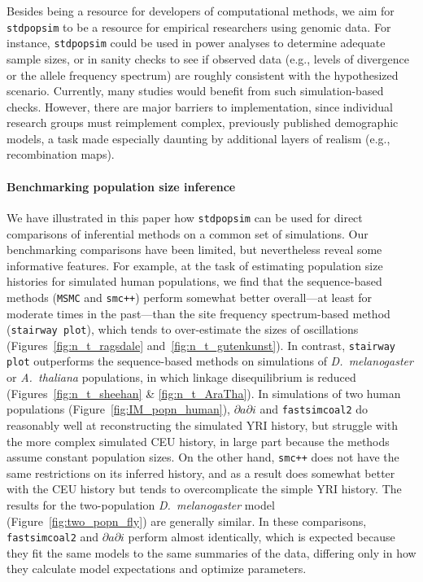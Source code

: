 \documentclass[12pt,halfline,a4paper]{ouparticle}
\newcommand{\stdpopsim}{\texttt{stdpopsim}\xspace}
\newcommand{\dadi}{$\partial a \partial i$\xspace}
\newcommand{\MSMC}{\texttt{MSMC}\xspace}
\newcommand{\smcpp}{\texttt{smc++}\xspace}
\newcommand{\stairwayplot}{\texttt{stairway plot}\xspace}
\newcommand{\fastsimcoal}{\texttt{fastsimcoal2}\xspace}
\begin{document}
Besides being a resource for developers of computational methods,
we aim for \stdpopsim to be a resource for empirical researchers using genomic data.
For instance, \stdpopsim could be used in power analyses to determine adequate sample sizes,
or in sanity checks to see if observed data
(e.g., levels of divergence or the allele frequency spectrum)
are roughly consistent with the hypothesized scenario.
Currently, many studies would benefit from such simulation-based checks.
However,  there are major barriers to implementation,
since individual research groups must reimplement complex, previously published demographic models,
a task made especially daunting by additional layers of realism (e.g., recombination maps).

\paragraph{Benchmarking population size inference}
We have illustrated in this paper how \stdpopsim can be used for direct
comparisons of inferential methods on a common set of simulations. Our
benchmarking comparisons have been limited, but nevertheless
reveal some informative features.
For example, at the task of estimating population size histories for simulated human
populations, we find that the sequence-based methods (\MSMC and \smcpp)
perform somewhat better overall---at least for moderate times in the past---than
the site frequency spectrum-based method (\stairwayplot),
which tends to over-estimate the sizes of oscillations
(Figures~\ref{fig:n_t_ragsdale} and~\ref{fig:n_t_gutenkunst}).
In contrast, \stairwayplot outperforms the sequence-based methods
on simulations of \textit{D.~melanogaster} or \textit{A.~thaliana} populations,
in which linkage disequilibrium is reduced (Figures~\ref{fig:n_t_sheehan} \& \ref{fig:n_t_AraTha}).
In simulations of two human populations
(Figure~\ref{fig:IM_popn_human}), \dadi and \fastsimcoal do reasonably well at
reconstructing the simulated YRI history, but struggle with the more complex simulated CEU
history, in large part because the methods assume constant population sizes.
On the other hand, \smcpp does not have the same
restrictions on its inferred history, and as a result does somewhat better
with the CEU history but tends to overcomplicate the simple YRI history.
The results for
the two-population \textit{D.~melanogaster} model (Figure~\ref{fig:two_popn_fly})
are generally similar.
In these comparisons, \fastsimcoal and \dadi perform almost identically, which is expected because they fit the same models to the same summaries of the data, differing only in how they calculate model expectations and optimize parameters.
\end{document}
